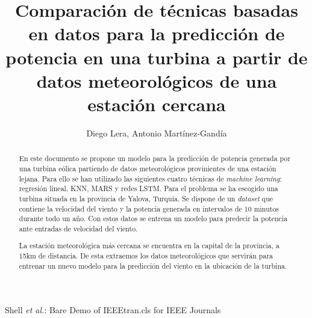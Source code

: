 \documentclass[journal]{IEEEtran}
\begin{document}
\title{Comparación de técnicas basadas en datos para la predicción de potencia en una turbina a partir de datos meteorológicos de una estación cercana}

\author{Diego Lera, Antonio Martínez-Gandía}%

%
{Shell \MakeLowercase{\textit{et al.}}: Bare Demo of IEEEtran.cls for IEEE Journals}

\maketitle

\begin{abstract}


En este documento se propone un modelo para la predicción de potencia generada por una turbina eólica partiendo de datos meteorológicos provinientes de una estación lejana.
Para ello se han utilizado las siguientes cuatro técnicas de \emph{machine learning}: regresión lineal, KNN, MARS y redes LSTM.
Para el problema se ha escogido una turbina situada en la provincia de Yalova, Turquía. Se dispone de un \emph{dataset} que contiene la velocidad del viento y la potencia generada en intervalos de 10 minutos durante todo un año. Con estos datos se entrena un modelo para predecir la potencia ante entradas de velocidad del viento. 

La estación meteorológica más cercana se encuentra en la capital de la provincia, a 15km de distancia. De esta extraemos los datos meteorológicos que servirán para entrenar un nuevo modelo para la predicción del viento en la ubicación de la turbina.


\end{abstract}
\end{document}
